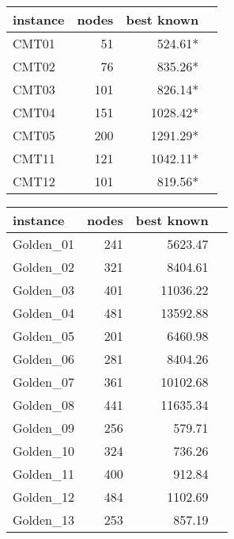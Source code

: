 \begin{table}[t]
\centering 
\begin{minipage}{0.48\textwidth}
\begin{tabular}{lrrr}
instance & nodes &best known \\
\toprule
CMT01	& 51 &524.61*  \\
CMT02	& 76 &835.26*  \\
CMT03	& 101&826.14*  \\
CMT04	& 151&1028.42* \\
CMT05	& 200&1291.29* \\
CMT11	& 121&1042.11* \\
CMT12	& 101&819.56*  \\      
\bottomrule
\end{tabular}
\end{minipage}
%
\begin{minipage}{0.48\textwidth}
\begin{tabular}{lrrr}
instance & nodes &best known \\
\toprule
Golden\_01 & 241 &	5623.47	\\
Golden\_02 & 321 &	8404.61	\\
Golden\_03 & 401 &	11036.22\\
Golden\_04 & 481 &	13592.88\\
Golden\_05 & 201 &	6460.98	\\
Golden\_06 & 281 &	8404.26	\\
Golden\_07 & 361 &	10102.68\\
Golden\_08 & 441 &	11635.34\\
Golden\_09 & 256 &	579.71	\\
Golden\_10 & 324 &	736.26	\\
Golden\_11 & 400 &	912.84	\\
Golden\_12 & 484 &	1102.69	\\
Golden\_13 & 253 &	857.19	\\

\end{tabular}
\end{minipage}
\end{table}
